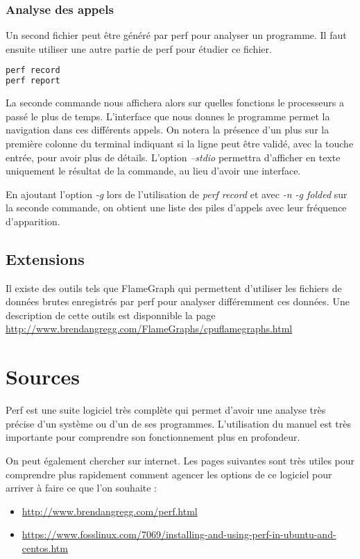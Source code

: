\documentclass[a4paper, 12pt]{article}
\newcommand{\changeurlcolor}[1]{\hypersetup{urlcolor=#1}}
\begin{document}
    \subsubsection{Analyse des appels}
    Un second fichier peut être généré par perf pour analyser un programme. Il faut ensuite utiliser une autre partie de perf pour étudier ce fichier.
    \begin{mdframed}[backgroundcolor=light-gray, roundcorner=20pt,
        innerleftmargin=20, innertopmargin=1, innerbottommargin=1, 
        outerlinewidth=1, linecolor=darkgray]
        \begin{lstlisting}[language=Bash]
perf record
perf report 
        \end{lstlisting}
    \end{mdframed}

    La seconde commande nous affichera alors sur quelles fonctions le processeurs a passé le plus de temps. L'interface que nous donnes le programme permet
    la navigation dans ces différents appels. On notera la présence d'un plus sur la première colonne du terminal indiquant si la ligne peut être validé, avec la touche entrée, pour avoir plus de détails.
    L'option \emph{--stdio} permettra d'afficher en texte uniquement le résultat de la commande, au lieu d'avoir une interface.

    En ajoutant l'option \emph{-g} lors de l'utilisation de \emph{perf record} et avec \emph{-n -g folded} sur la seconde commande,
    on obtient une liste des piles d'appels avec leur fréquence d'apparition.

\subsection{Extensions}
    Il existe des outils tels que FlameGraph qui permettent d'utiliser les fichiers de données brutes enregistrés par perf pour analyser différemment ces données.
    Une description de cette outils est disponnible la page \changeurlcolor{blue}\href{http://www.brendangregg.com/FlameGraphs/cpuflamegraphs.html}{http://www.brendangregg.com/FlameGraphs/cpuflamegraphs.html}

\section{Sources}
    Perf est une suite logiciel très complète qui permet d'avoir une analyse très précise d'un système ou d'un de ses programmes.
    L'utilisation du manuel est très importante pour comprendre son fonctionnement plus en profondeur.

    On peut également chercher sur internet. Les pages suivantes sont très utiles pour comprendre plus rapidement comment agencer les options de ce logiciel pour arriver à faire ce que l'on souhaite :
    \begin{itemize}
        \item \changeurlcolor{blue}\href{http://www.brendangregg.com/perf.html}{http://www.brendangregg.com/perf.html}
        \item \changeurlcolor{blue}\href{https://www.fosslinux.com/7069/installing-and-using-perf-in-ubuntu-and-centos.htm}{https://www.fosslinux.com/7069/installing-and-using-perf-in-ubuntu-and-centos.htm}
    \end{itemize}
\end{document}
